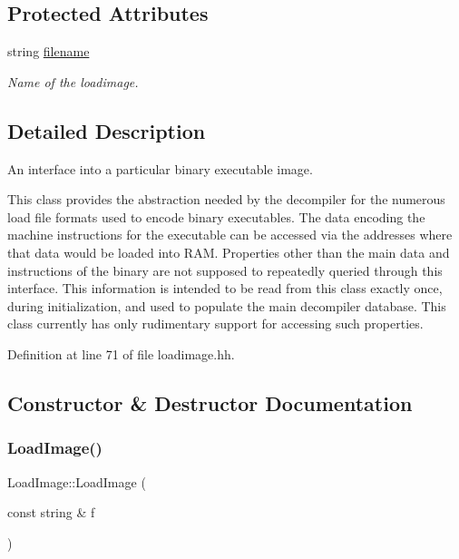 \subsection*{Protected Attributes}
\begin{DoxyCompactItemize}
\item 
string \mbox{\hyperlink{class_load_image_a4d95f3891fc75d7549277d5f26fa06fc}{filename}}
\begin{DoxyCompactList}\small\item\em Name of the loadimage. \end{DoxyCompactList}\end{DoxyCompactItemize}


\subsection{Detailed Description}
An interface into a particular binary executable image. 

This class provides the abstraction needed by the decompiler for the numerous load file formats used to encode binary executables. The data encoding the machine instructions for the executable can be accessed via the addresses where that data would be loaded into R\+AM. Properties other than the main data and instructions of the binary are not supposed to repeatedly queried through this interface. This information is intended to be read from this class exactly once, during initialization, and used to populate the main decompiler database. This class currently has only rudimentary support for accessing such properties. 

Definition at line 71 of file loadimage.\+hh.



\subsection{Constructor \& Destructor Documentation}
\mbox{\label{class_load_image_a4fc6f708cad0202b134c79069af89cc3}} 
\subsubsection{\texorpdfstring{LoadImage()}{LoadImage()}}
{\footnotesize\ttfamily Load\+Image\+::\+Load\+Image (\begin{DoxyParamCaption}\item[{const string \&}]{f }\end{DoxyParamCaption})\hspace{0.3cm}{\ttfamily [inline]}}



